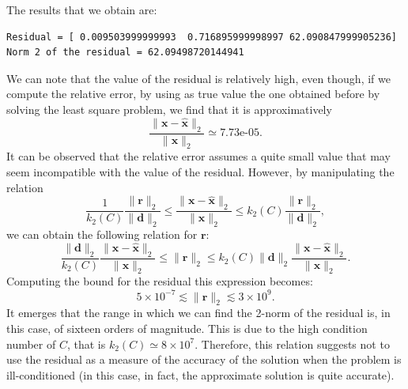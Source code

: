 \documentclass[a4paper,11pt]{article}
\begin{document}
\noindent The results that we obtain are:
\begin{verbatim}
Residual = [ 0.009503999999993  0.716895999998997 62.090847999905236]
Norm 2 of the residual = 62.09498720144941
\end{verbatim}
We can note that the value of the residual is relatively high, even though, if we compute the relative error, by using as true value the one obtained before by solving the least square problem, we find that it is approximatively
\begin{equation}\label{key}
	\frac{\lVert  \textbf{x} - \hat{\textbf{x}} \rVert_2 }{\lVert  \textbf{x} \rVert_2 }  \simeq 7.73\text{e-05}.
\end{equation}
It can be observed that the relative error assumes a quite small value that may seem incompatible with the value of the residual.
\noindent However, by manipulating the relation
\begin{equation}\label{key}
	\frac{1}{k_2(C)} \frac{\lVert  \textbf{r}  \rVert_2 }{\lVert  \textbf{d}  \rVert_2 } \le \frac{\lVert  \textbf{x} - \hat{\textbf{x}} \rVert_2 }{\lVert  \textbf{x} \rVert_2 } \le k_2(C) \frac{\lVert  \textbf{r}  \rVert_2 }{\lVert  \textbf{d}  \rVert_2 },
\end{equation}
we can obtain the following relation for $\textbf{r} $:
\begin{equation}\label{key}
	\frac{\lVert  \textbf{d}  \rVert_2}{k_2(C)} \frac{\lVert  \textbf{x} - \hat{\textbf{x}} \rVert_2 }{\lVert  \textbf{x} \rVert_2 }\le \lVert  \textbf{r}  \rVert_2 \le k_2(C) \lVert  \textbf{d}  \rVert_2 \frac{\lVert  \textbf{x} - \hat{\textbf{x}} \rVert_2 }{\lVert  \textbf{x} \rVert_2 }.
\end{equation}
\noindent Computing the bound for the residual this expression becomes:
\begin{equation}\label{key}
	5 \times 10^{-7} \lesssim \lVert  \textbf{r}  \rVert_2 \lesssim 3 \times 10^9.
\end{equation}
\noindent It emerges that the range in which we can find the 2-norm of the residual is, in this case, of sixteen orders of magnitude. This is due to the high condition number of $C$, that is $k_2(C)  \simeq 8 \times 10^7$. Therefore, this relation suggests not to use the residual as a measure of the accuracy of the solution when the problem is ill-conditioned (in this case, in fact, the approximate solution is quite accurate).
\end{document}
